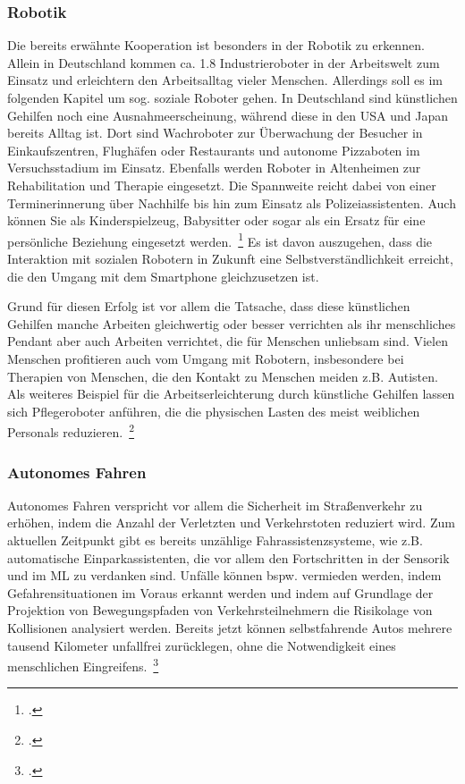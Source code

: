 \subsubsection{Robotik}
Die bereits erwähnte Kooperation ist besonders in der Robotik zu erkennen. Allein in Deutschland kommen ca. 1.8 Industrieroboter in der Arbeitswelt zum Einsatz und erleichtern
den Arbeitsalltag vieler Menschen. Allerdings soll es im folgenden Kapitel um sog. soziale Roboter gehen. In Deutschland sind künstlichen Gehilfen noch eine Ausnahmeerscheinung,
während diese in den USA und Japan bereits Alltag ist. Dort sind Wachroboter zur Überwachung der Besucher in Einkaufszentren, Flughäfen oder Restaurants und autonome Pizzaboten im Versuchsstadium im Einsatz. Ebenfalls werden Roboter in 
Altenheimen zur Rehabilitation und Therapie eingesetzt. Die Spannweite reicht dabei von einer Terminerinnerung über Nachhilfe bis hin zum Einsatz als Polizeiassistenten.
Auch können Sie als Kinderspielzeug, Babysitter oder sogar als ein Ersatz für eine persönliche Beziehung eingesetzt werden.~\footcite[\vglf][]{Heinrichs.2022}
Es ist davon auszugehen, dass die Interaktion mit sozialen Robotern in Zukunft eine Selbstverständlichkeit erreicht, die den Umgang mit dem Smartphone gleichzusetzen ist.

Grund für diesen Erfolg ist vor allem die Tatsache, dass diese künstlichen Gehilfen manche Arbeiten gleichwertig oder besser verrichten als ihr menschliches Pendant aber auch
Arbeiten verrichtet, die für Menschen unliebsam sind. 
Vielen Menschen profitieren auch vom Umgang mit Robotern, insbesondere bei Therapien von Menschen, die den Kontakt zu Menschen meiden z.B. Autisten. Als weiteres Beispiel für die Arbeitserleichterung durch künstliche Gehilfen lassen sich 
Pflegeroboter anführen, die die physischen Lasten des meist weiblichen Personals reduzieren.~\footcite[\vglf][]{Heinrichs.2022}

\subsubsection{Autonomes Fahren}
Autonomes Fahren verspricht vor allem die Sicherheit im Straßenverkehr zu erhöhen, indem die Anzahl der Verletzten und Verkehrstoten reduziert wird. Zum aktuellen Zeitpunkt
gibt es bereits unzählige Fahrassistenzsysteme, wie z.B. automatische Einparkassistenten, die vor allem den Fortschritten in der Sensorik und im \ac{ML} zu verdanken sind.
Unfälle können bspw. vermieden werden, indem Gefahrensituationen im Voraus erkannt werden und indem auf Grundlage der Projektion von Bewegungspfaden von Verkehrsteilnehmern die Risikolage
von Kollisionen analysiert werden.
Bereits jetzt können selbstfahrende Autos mehrere tausend Kilometer unfallfrei zurücklegen, ohne die Notwendigkeit eines menschlichen Eingreifens.~\footcite[\vglf][]{Scherk.2017}

